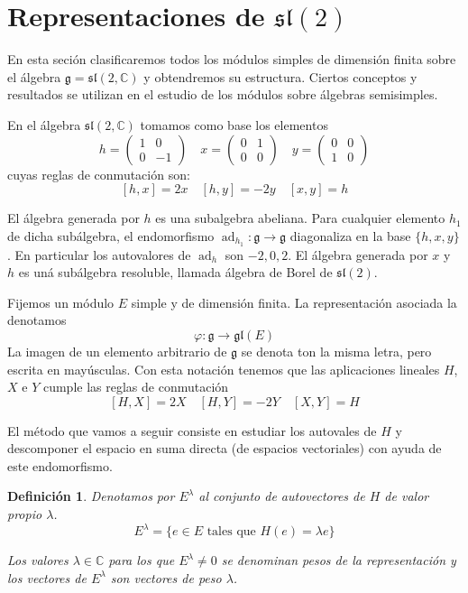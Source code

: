 \documentclass[a4paper,draft,12pt]{article}
\newtheorem{defi}{Definición}[section]%
\newcommand{\C}{\mathbb{C}}%
\newcommand{\g}{\mathfrak{g}}%
\newcommand{\lto}{\longrightarrow}%
\newcommand{\df}[1]{\textsf{\color{blue}#1}}
\DeclareMathOperator{\ad}{ad}  %
\begin{document}
\newpage

\section{Representaciones de $\mathfrak{sl}(2)$}

En esta seción clasificaremos todos los módulos simples de dimensión finita sobre el álgebra $\g= \mathfrak{sl}(2, \C)$ y obtendremos su estructura.  Ciertos conceptos y resultados se utilizan en el estudio de los módulos sobre álgebras semisimples.

\bigskip

En el álgebra $\mathfrak{sl}(2, \C)$ tomamos como base los elementos
$$
h= 
\begin{pmatrix}
1 & 0 \\
0 & -1
\end{pmatrix}
\quad
x =
\begin{pmatrix}
0 & 1 \\
0 & 0 
\end{pmatrix}
\quad
y= 
\begin{pmatrix}
0 & 0 \\
1 & 0 
\end{pmatrix}
$$
cuyas reglas de conmutación son:
$$
[h,x]= 2x \quad [h,y]= -2y \quad [x,y]= h
$$

\bigskip


El álgebra generada por $h$ es una subalgebra abeliana.  Para cualquier elemento $h_1$ de dicha subálgebra, el endomorfismo $\ad_{h_1} : \g \rightarrow \g$ diagonaliza en la base $\{h,x,y\}$.  En particular los autovalores de $\ad_h$ son $-2,0,2$. 
El álgebra generada por $x$ y $h$ es uná subálgebra resoluble, llamada álgebra de Borel de $\mathfrak{sl}(2)$.

\bigskip

Fijemos un módulo $E$ simple y de dimensión finita.  La representación asociada la denotamos
$$
\varphi: \g \lto \mathfrak{gl}(E)
$$
La imagen de un elemento arbitrario de $\g$ se denota ton la misma letra, pero escrita en mayúsculas.  Con esta notación tenemos que las aplicaciones lineales $H$, $X$ e $Y$ cumple las reglas de conmutación
$$
[H,X]= 2X \quad [H,Y]= -2Y \quad [X,Y]= H
$$

El método que vamos a seguir consiste en estudiar los autovales de $H$ y descomponer el espacio en suma directa (de espacios vectoriales) con ayuda de este endomorfismo.

\begin{defi}

Denotamos por $E^\lambda$ al conjunto de autovectores de $H$ de valor propio $\lambda$.
$$
E^\lambda=\{e \in E \text{ tales que } H(e)= \lambda e\}
$$

Los valores $\lambda \in \C$ para los que $E^\lambda \neq 0$ se denominan  \df{pesos} de la representación y los vectores de $E^\lambda$ son vectores de peso $\lambda$.

\end{defi}
\end{document}
